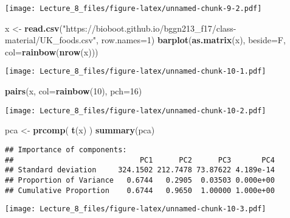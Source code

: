 \documentclass[]{article}
\newenvironment{Shaded}{\begin{snugshade}}{\end{snugshade}}
\newcommand{\DataTypeTok}[1]{\textcolor[rgb]{0.13,0.29,0.53}{#1}}
\newcommand{\DecValTok}[1]{\textcolor[rgb]{0.00,0.00,0.81}{#1}}
\newcommand{\KeywordTok}[1]{\textcolor[rgb]{0.13,0.29,0.53}{\textbf{#1}}}
\newcommand{\NormalTok}[1]{#1}
\newcommand{\OperatorTok}[1]{\textcolor[rgb]{0.81,0.36,0.00}{\textbf{#1}}}
\newcommand{\StringTok}[1]{\textcolor[rgb]{0.31,0.60,0.02}{#1}}
\begin{document}
\texttt{[image: Lecture\_8\_files/figure-latex/unnamed-chunk-9-2.pdf]}

\begin{Shaded}
\begin{Highlighting}[]
\NormalTok{x <-}\StringTok{ }\KeywordTok{read.csv}\NormalTok{(}\StringTok{"https://bioboot.github.io/bggn213_f17/class-material/UK_foods.csv"}\NormalTok{, }\DataTypeTok{row.names=}\DecValTok{1}\NormalTok{)}
\KeywordTok{barplot}\NormalTok{(}\KeywordTok{as.matrix}\NormalTok{(x), }\DataTypeTok{beside=}\NormalTok{F, }\DataTypeTok{col=}\KeywordTok{rainbow}\NormalTok{(}\KeywordTok{nrow}\NormalTok{(x)))}
\end{Highlighting}
\end{Shaded}

\texttt{[image: Lecture\_8\_files/figure-latex/unnamed-chunk-10-1.pdf]}

\begin{Shaded}
\begin{Highlighting}[]
\KeywordTok{pairs}\NormalTok{(x, }\DataTypeTok{col=}\KeywordTok{rainbow}\NormalTok{(}\DecValTok{10}\NormalTok{), }\DataTypeTok{pch=}\DecValTok{16}\NormalTok{)}
\end{Highlighting}
\end{Shaded}

\texttt{[image: Lecture\_8\_files/figure-latex/unnamed-chunk-10-2.pdf]}

\begin{Shaded}
\begin{Highlighting}[]
\NormalTok{pca <-}\StringTok{ }\KeywordTok{prcomp}\NormalTok{( }\KeywordTok{t}\NormalTok{(x) )}
\KeywordTok{summary}\NormalTok{(pca)}
\end{Highlighting}
\end{Shaded}

\begin{verbatim}
## Importance of components:
##                             PC1      PC2      PC3       PC4
## Standard deviation     324.1502 212.7478 73.87622 4.189e-14
## Proportion of Variance   0.6744   0.2905  0.03503 0.000e+00
## Cumulative Proportion    0.6744   0.9650  1.00000 1.000e+00
\end{verbatim}

\begin{Shaded}
\end{Shaded}

\texttt{[image: Lecture\_8\_files/figure-latex/unnamed-chunk-10-3.pdf]}
\end{document}
